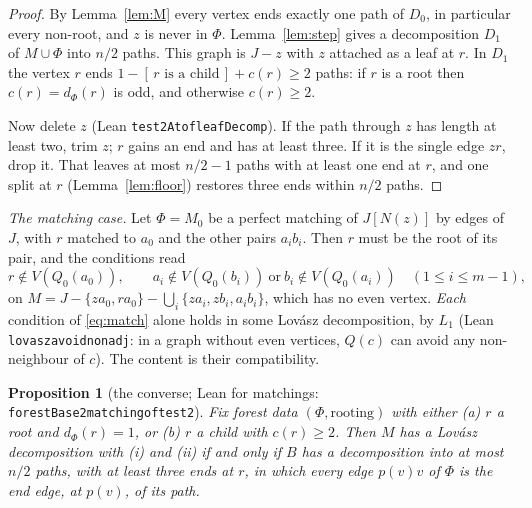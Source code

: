 \documentclass[11pt]{amsart}
\newtheorem{proposition}[theorem]{Proposition}
\theoremstyle{definition}
\theoremstyle{remark}
\renewcommand{\_}{\oldunderscore\allowbreak}
\newcommand{\ind}[1]{[\,#1\,]}
\begin{document}
\begin{proof}
By Lemma~\ref{lem:M} every vertex ends exactly one path of $D_0$, in particular every non-root, and
$z$ is never in $\Phi$. Lemma~\ref{lem:step} gives a decomposition $D_1$ of $M\cup\Phi$ into $n/2$
paths. This graph is $J-z$ with $z$ attached as a leaf at $r$. In $D_1$ the vertex $r$ ends
$1-\ind{r\text{ is a child}}+c(r)\ge2$ paths: if $r$ is a root then $c(r)=d_\Phi(r)$ is odd, and
otherwise $c(r)\ge2$.

Now delete $z$ (Lean \texttt{test2At\_of\_leafDecomp}). If the path through $z$ has length at least
two, trim $z$; $r$ gains an end and has at least three. If it is the single edge $zr$, drop it.
That leaves at most $n/2-1$ paths with at least one end at $r$, and one split at $r$
(Lemma~\ref{lem:floor}) restores three ends within $n/2$ paths.
\end{proof}

\emph{The matching case.} Let $\Phi=M_0$ be a perfect matching of $J[N(z)]$ by edges of $J$, with
$r$ matched to $a_0$ and the other pairs $a_ib_i$. Then $r$ must be the root of its pair, and the
conditions read
\begin{equation}\label{eq:match}
r\notin V(Q_0(a_0)),\qquad a_i\notin V(Q_0(b_i))\ \text{or}\ b_i\notin V(Q_0(a_i))\quad(1\le i\le m-1),
\end{equation}
on $M=J-\{za_0,ra_0\}-\bigcup_i\{za_i,zb_i,a_ib_i\}$, which has no even vertex. \emph{Each} condition of
\eqref{eq:match} alone holds in some Lov\'asz decomposition, by $L_1$ (Lean
\texttt{lovasz\_avoid\_nonadj}: in a graph without even vertices, $Q(c)$ can avoid any non-neighbour
of $c$). The content is their compatibility.

\begin{proposition}[the converse; Lean for matchings: \texttt{forestBase2\_matching\_of\_test2}]\label{prop:conv}
Fix forest data $(\Phi,\text{rooting})$ with either (a) $r$ a root and $d_\Phi(r)=1$, or (b) $r$ a child
with $c(r)\ge2$. Then $M$ has a Lov\'asz decomposition with (i) and (ii) if and only if $B$ has a
decomposition into at most $n/2$ paths, with at least three ends at $r$, in which every edge $p(v)v$
of $\Phi$ is the end edge, at $p(v)$, of its path.
\end{proposition}
\end{document}

